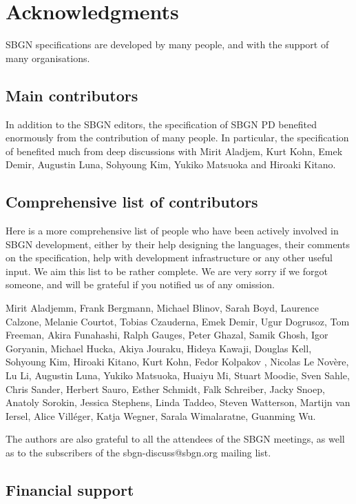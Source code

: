 \chapter{Acknowledgments}\label{sec:acknowledgments}

SBGN specifications are developed by many people, and with the support of many organisations.

\section{Main contributors}

In addition to the SBGN editors, the specification of SBGN PD benefited enormously from the contribution of many people. In particular, the specification of \SBGNERLone benefited much from deep discussions with Mirit Aladjem, Kurt Kohn, Emek Demir, Augustin Luna, Sohyoung Kim, Yukiko Matsuoka and Hiroaki Kitano. 

\section{Comprehensive list of contributors}

Here is a more comprehensive list of people who have been actively involved in SBGN development, either by their help designing the languages, their comments on the specification, help with development infrastructure or any other useful input.  We aim this list to be rather complete. We are very sorry if we forgot someone, and will be grateful if you notified us of any omission.

Mirit Aladjemm, Frank Bergmann, Michael Blinov, Sarah Boyd, Laurence Calzone, Melanie Courtot, Tobias Czauderna, Emek Demir, Ugur Dogrusoz, Tom Freeman, Akira Funahashi, Ralph Gauges, Peter Ghazal, Samik Ghosh, Igor Goryanin, Michael Hucka, Akiya Jouraku, Hideya Kawaji, Douglas Kell, Sohyoung Kim, Hiroaki Kitano, Kurt Kohn, Fedor Kolpakov , Nicolas Le Nov\`{e}re, Lu Li, Augustin Luna, Yukiko Matsuoka, Huaiyu Mi, Stuart Moodie, Sven Sahle, Chris Sander, Herbert Sauro, Esther Schmidt, Falk Schreiber, Jacky Snoep, Anatoly Sorokin, Jessica Stephens, Linda Taddeo, Steven Watterson, Martijn van Iersel, Alice Vill\'{e}ger, Katja Wegner, Sarala Wimalaratne, Guanming Wu.

The authors are also grateful to all the attendees of the SBGN meetings, as well as to the subscribers of the sbgn-discuss@sbgn.org mailing list.

\section{Financial support}

